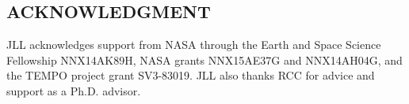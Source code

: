 \documentclass[a4paper,10pt,oneside]{article}
\begin{document}
\begin{sloppy}
\section{ACKNOWLEDGMENT}
\label{sec:ack}

JLL acknowledges support from NASA through the Earth and Space Science Fellowship NNX14AK89H, NASA grants NNX15AE37G and NNX14AH04G, and the TEMPO project grant SV3-83019.  JLL also thanks RCC for advice and support as a Ph.D. advisor.






\end{sloppy}
\end{document}
